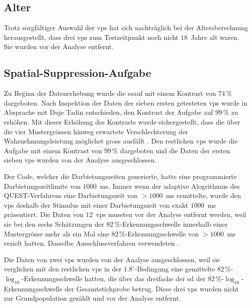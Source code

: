 \documentclass[11pt, twoside, a4paper]{book}		%
\begin{document}
\subsection*{Alter}
Trotz sorgfältiger Auswahl der \glspl{vp} hat sich nachträglich bei der Altersberechnung herausgestellt, dass drei \glspl{vp} zum Testzeitpunkt noch nicht $18$~Jahre alt waren. Sie wurden vor der Analyse entfernt.

\subsection*{Spatial-Suppression-Aufgabe}
Zu Beginn der Datenerhebung wurde die \gls{ssauf} mit einem Kontrast von $74\,\%$ dargeboten. Nach Inspektion der Daten der sieben ersten getesteten \glspl{vp} wurde in Absprache mit Duje Tadin entschieden, den Kontrast der Aufgabe auf $99\,\%$ zu erhöhen. Mit dieser Erhöhung des Kontrasts wurde sichergestellt, dass die über die vier Mustergrössen hinweg erwartete Verschlechterung der Wahrnehmungsleistung möglichst gross ausfällt \citep[für den Zusammenhang zwischen Kontrast und Wahrnehmungsleistung siehe][]{Tadin2003}. Den restlichen \glspl{vp} wurde die Aufgabe mit einem Kontrast von $99\,\%$ dargeboten und die Daten der ersten sieben \glspl{vp} wurden von der Analyse ausgeschlossen.

Der Code, welcher die Darbietungszeiten generierte, hatte eine programmierte Darbietungszeitlimite von $1000$~ms. Immer wenn der adaptive Alogrithmus des QUEST-Verfahrens \citep{Watson1983} eine Darbietungszeit von $> 1000$~ms ermittelte, wurde den \glspl{vp} deshalb der Stimulus mit einer Darbietungszeit von exakt $1000$~ms präsentiert. 
Die Daten von $12$~\glspl{vp} mussten vor der Analyse entfernt werden, weil sie bei den sechs Schätzungen der $82\,\%$-Er\-ken\-nungs\-schwel\-le innerhalb einer Mustergrösse mehr als ein Mal eine $82\,\%$-Er\-ken\-nungs\-schwel\-le von $> 1000$~ms erzielt hatten. Dasselbe Ausschlussverfahren verwendeten \citet{Melnick2013}.

Die Daten von zwei \glspl{vp} wurden von der Analyse ausgeschlossen, weil sie verglichen mit den restlichen \glspl{vp} in der $1.8^{\circ}$-Be\-ding\-ung eine gemittelte $82\,\%$-$\log_{10}$-Er\-ken\-nungs\-schwel\-le hatten, die über das dreifache der \gls{sd} der $82\,\%$-$\log_{10}$-Er\-ken\-nungs\-schwel\-le der Gesamtstichprobe betrug. Diese drei \glspl{vp} wurden nicht zur Grundpopulation gezählt und vor der Analyse entfernt.

\end{document}
